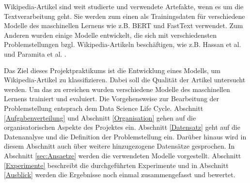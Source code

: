 \label{Einleitung}
Wikipedia-Artikel sind weit studierte und verwendete Artefakte, wenn es um die Textverarbeitung geht. Sie werden zum einen als Trainingsdaten für verschiedene Modelle des maschinellen Lernens wie z.B. BERT \cite{BERTReference} und FastText \cite{DBLP:journals/corr/BojanowskiGJM16} verwendet. Zum Anderen wurden einige Modelle entwickelt, die sich mit verschiedensten Problemstellungen bzgl. Wikipedia-Artikeln beschäftigen, wie z.B. Hassan et al. \cite{shavarani2020multiclassmultilingualclassificationwikipedia} und Paramita et al. \cite{das2024languageagnosticmodelingwikipediaarticles}.

Das Ziel dieses Projektpraktikums ist die Entwicklung eines Modells, um Wikipedia-Artikel zu klassifizieren. Dabei soll die Qualität der Artikel untersucht werden. Um das zu erreichen wurden verschiedene Modelle des maschinellen Lernens trainiert und evaluiert. Die Vorgehensweise zur Bearbeitung der Problemstellung entsprach dem Data Science Life Cycle. Abschnitt \ref{Aufgabenverteilung} und Abschnitt \ref{Organisation} gehen auf die organisatorischen Aspekte des Projektes ein. Abschnitt \ref{Datensatz} geht auf die Datenanalyse und die Definition der Problemstellung ein. Darüber hinaus wird in diesem Abschnitt auch über weitere hinzugezogene Datensätze gesprochen. In Abschnitt \ref{sec:Ansaetze} werden die verwendeten Modelle vorgestellt. 
Abschnitt \ref{Experimente} beschreibt die durchgeführten Experimente und in Abschnitt \ref{Ausblick} werden die Ergebnisse noch einmal zusammengefasst und bewertet.

